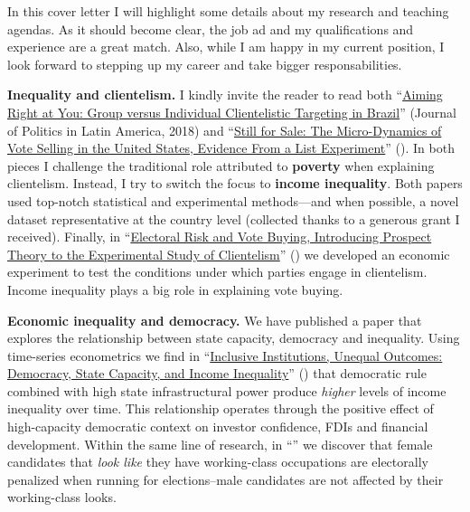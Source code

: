 \documentclass[10pt,stdletter,dateno,sigleft]{newlfm} %
\begin{document}
\begin{newlfm}


{\unskip}


In this cover letter I will highlight some details about my research and teaching agendas. As it should become clear, the job ad and my qualifications and experience are a great match. Also, while I am happy in my current position, I look forward to stepping up my career and take bigger responsabilities.

{\bf Inequality and clientelism.} I kindly invite the reader to read both ``\href{https://journals.sub.uni-hamburg.de/giga/jpla/article/view/1121/1128}{Aiming Right at You: Group versus Individual Clientelistic Targeting in Brazil}'' (Journal of Politics in Latin America, 2018) and ``\href{https://doi.org/10.1057/s41269-020-00174-4}{Still for Sale: The Micro-Dynamics of Vote Selling in the United States, Evidence From a List Experiment}'' ({\unskip}). In both pieces I challenge the traditional role attributed to {\bf poverty} when explaining clientelism. Instead, I try to switch the focus to {\bf income inequality}. Both papers used top-notch statistical and experimental methods---and when possible, a novel dataset representative at the country level (collected thanks to a generous grant I received). Finally, in ``\href{https://doi.org/10.1016/j.electstud.2022.102497}{Electoral Risk and Vote Buying, Introducing Prospect Theory to the Experimental Study of Clientelism}'' ({\unskip}) we developed an economic experiment to test the conditions under which parties engage in clientelism. Income inequality plays a big role in explaining vote buying.

{\bf Economic inequality and democracy.} We have published a paper that explores the relationship between state capacity, democracy and inequality. Using time-series econometrics we find in ``\href{https://doi.org/10.1016/j.ejpoleco.2021.102048}{Inclusive Institutions, Unequal Outcomes: Democracy, State Capacity, and Income Inequality}'' ({\unskip}) that democratic rule combined with high state infrastructural power produce \emph{higher} levels of income inequality over time. This relationship operates through the positive effect of high-capacity democratic context on investor confidence, FDIs and financial development. Within the same line of research, in ``\href{https://doi.org/10.1111/pops.12940}{}'' we discover that female candidates that \emph{look like} they have working-class occupations are electorally penalized when running for elections--male candidates are not affected by their working-class looks.


\end{newlfm}
\end{document}
